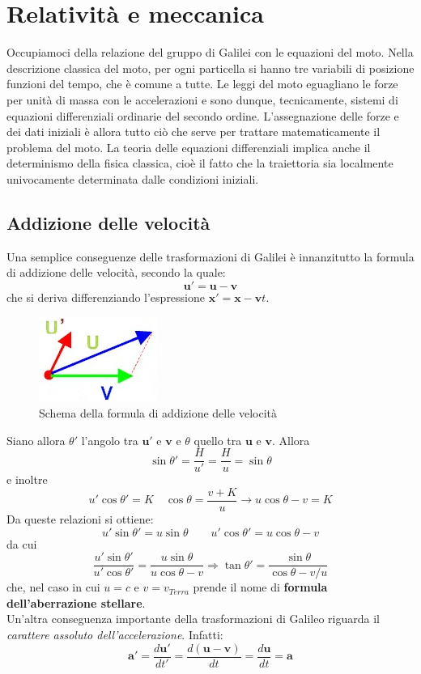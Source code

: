 \documentclass[a4paper,11pt]{book}
\theoremstyle{plain}
\theoremstyle{definition}
\begin{document}
\section{Relatività e meccanica}
Occupiamoci della relazione del gruppo di Galilei con le equazioni del moto. Nella descrizione classica del moto, per ogni particella si hanno tre variabili di posizione funzioni del 
tempo, che è comune a tutte. Le leggi del moto eguagliano le forze per unità di massa con 
le accelerazioni e sono dunque, tecnicamente, sistemi di equazioni differenziali ordinarie 
del secondo ordine. L'assegnazione delle forze e dei dati iniziali è allora tutto ciò che serve 
per trattare matematicamente il problema del moto. La teoria delle equazioni differenziali implica anche il determinismo della fisica classica, cioè il fatto che la traiettoria sia localmente univocamente 
determinata dalle condizioni iniziali. 

\subsection{Addizione delle velocità}
Una semplice conseguenze delle trasformazioni di Galilei è  innanzitutto la formula di 
addizione delle velocità, secondo la quale: 
\[
\textbf{u}'=\textbf{u}-\textbf{v}
\]
che si deriva differenziando l'espressione $\textbf{x}'=\textbf{x}-\textbf{v}t$. 
\begin{figure}[!h]
\centering
\includegraphics[scale=0.45]{addizione}
\caption{Schema della formula di addizione delle velocità}
\end{figure}
Siano allora $\theta'$ l’angolo tra $\textbf{u}'$ e $\textbf{v}$ e $\theta$ quello tra $\textbf{u}$ e $\textbf{v}$. Allora
\[
\sin \theta' = \frac{H}{u'}=\frac{H}{u}=\sin \theta
\]
e inoltre
\[
u'\cos \theta'=K \quad \cos\theta=\frac{v+K}{u} \to u\cos\theta-v=K
\]
Da queste relazioni si ottiene:
\begin{equation}
u'\sin\theta'=u\sin\theta \qquad u'\cos\theta'=u\cos\theta-v
\end{equation}
da cui
\begin{equation}
\frac{u'\sin\theta'}{u'\cos\theta'}=\frac{u\sin\theta}{u\cos\theta-v} \Longrightarrow \tan\theta'=\frac{\sin\theta}{\cos\theta-v/u}
\end{equation}
che, nel caso in cui $u=c$ e $v=v_{Terra}$ prende il nome di \textbf{formula dell'aberrazione stellare}. \\
Un'altra conseguenza importante della trasformazioni di Galileo riguarda il \emph{carattere assoluto dell'accelerazione}. Infatti:
\[
\textbf{a}'=\frac{d\textbf{u}'}{dt'}=\frac{d(\textbf{u}-\textbf{v})}{dt}=\frac{d\textbf{u}}{dt}=\textbf{a}
\]
\end{document}
